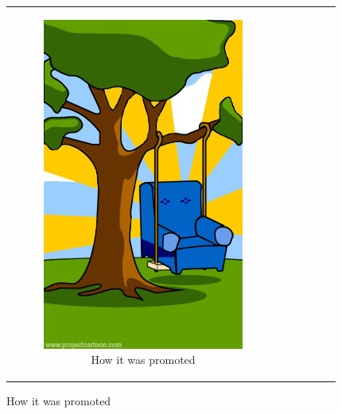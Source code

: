 \begin{figure}[h]
\begin{center}
\begin{tabular}{|c|c|c|c|c|c|}
\begin{subfigure}[t]{0.15\textwidth}\centering\includegraphics[width=0.9\columnwidth]{images/howdescribed}
\caption*{\tiny \centering How it was promoted}\label{fig:howsupported}\end{subfigure}&

\end{tabular}
\end{center}
\end{figure}
